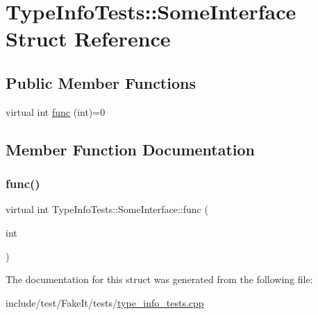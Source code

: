 \hypertarget{structTypeInfoTests_1_1SomeInterface}{}\section{Type\+Info\+Tests\+::Some\+Interface Struct Reference}
\label{structTypeInfoTests_1_1SomeInterface}
\subsection*{Public Member Functions}
\begin{DoxyCompactItemize}
\item 
virtual int \mbox{\hyperlink{structTypeInfoTests_1_1SomeInterface_a3b08144bc89f6d628d19003b1a0a6248}{func}} (int)=0
\end{DoxyCompactItemize}


\subsection{Member Function Documentation}
\mbox{\label{structTypeInfoTests_1_1SomeInterface_a3b08144bc89f6d628d19003b1a0a6248}} 
\subsubsection{\texorpdfstring{func()}{func()}}
{\footnotesize\ttfamily virtual int Type\+Info\+Tests\+::\+Some\+Interface\+::func (\begin{DoxyParamCaption}\item[{int}]{ }\end{DoxyParamCaption})\hspace{0.3cm}{\ttfamily [pure virtual]}}



The documentation for this struct was generated from the following file\+:\begin{DoxyCompactItemize}
\item 
include/test/\+Fake\+It/tests/\mbox{\hyperlink{type__info__tests_8cpp}{type\+\_\+info\+\_\+tests.\+cpp}}\end{DoxyCompactItemize}
